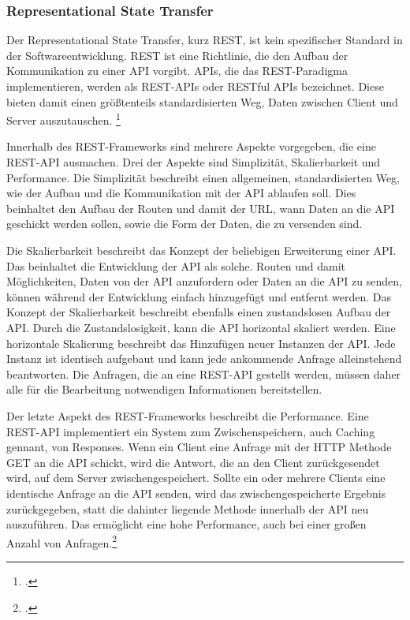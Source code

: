 \subsubsection{Representational State Transfer}
Der Representational State Transfer, kurz REST, ist kein spezifischer Standard in der Softwareentwicklung. REST ist eine Richtlinie, die den Aufbau der Kommunikation zu einer API vorgibt. APIs, die das REST-Paradigma implementieren, werden als REST-APIs oder RESTful APIs bezeichnet. Diese bieten damit einen größtenteils standardisierten Weg, Daten zwischen Client und Server auszutauschen. \footcite{richards2006representational}

Innerhalb des REST-Frameworks sind mehrere Aspekte vorgegeben, die eine REST-API ausmachen. Drei der Aspekte sind \glqq Simplizität\grqq{}, \glqq Skalierbarkeit\grqq{} und \glqq Performance\grqq{}. Die Simplizität beschreibt einen allgemeinen, standardisierten Weg, wie der Aufbau und die Kommunikation mit der API ablaufen soll. Dies beinhaltet den Aufbau der Routen und damit der URL, wann Daten an die API geschickt werden sollen, sowie die Form der Daten, die zu versenden sind. 

Die Skalierbarkeit beschreibt das Konzept der beliebigen Erweiterung einer API. Das beinhaltet die Entwicklung der API als solche. Routen und damit Möglichkeiten, Daten von der API anzufordern oder Daten an die API zu senden, können während der Entwicklung einfach hinzugefügt und entfernt werden. Das Konzept der Skalierbarkeit beschreibt ebenfalls einen zustandslosen Aufbau der API. Durch die Zustandslosigkeit, kann die API horizontal skaliert werden. Eine horizontale Skalierung beschreibt das Hinzufügen neuer Instanzen der API. Jede Instanz ist identisch aufgebaut und kann jede ankommende Anfrage alleinstehend beantworten. Die Anfragen, die an eine REST-API gestellt werden, müssen daher alle für die Bearbeitung notwendigen Informationen bereitstellen.

Der letzte Aspekt des REST-Frameworks beschreibt die Performance. Eine REST-API implementiert ein System zum Zwischenspeichern, auch Caching gennant, von Responses. Wenn ein Client eine Anfrage mit der HTTP Methode GET an die API schickt, wird die Antwort, die an den Client zurückgesendet wird, auf dem Server zwischengespeichert. Sollte ein oder mehrere Clients eine identische Anfrage an die API senden, wird das zwischengespeicherte Ergebnis zurückgegeben, statt die dahinter liegende Methode innerhalb der API neu auszuführen. Das ermöglicht eine hohe Performance, auch bei einer großen Anzahl von Anfragen.\footcite{fielding2000rest}

